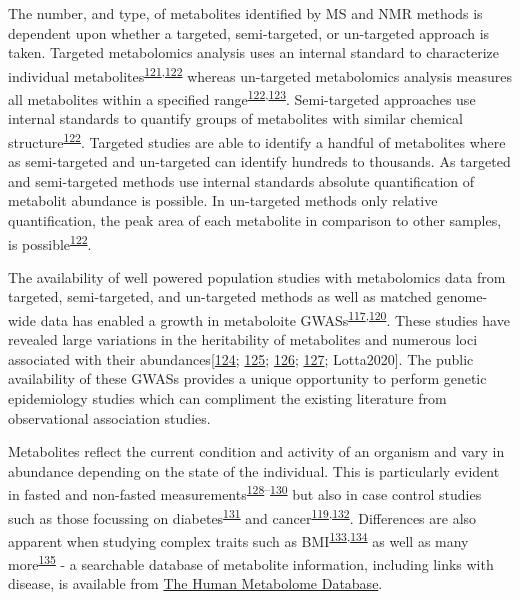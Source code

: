 \documentclass[11pt,twoside]{bristolthesis}
\begin{document}
The number, and type, of metabolites identified by MS and NMR methods is dependent upon whether a targeted, semi-targeted, or un-targeted approach is taken. Targeted metabolomics analysis uses an internal standard to characterize individual metabolites\textsuperscript{\protect\hyperlink{ref-Roberts2012}{121},\protect\hyperlink{ref-Liu2017b}{122}} whereas un-targeted metabolomics analysis measures all metabolites within a specified range\textsuperscript{\protect\hyperlink{ref-Liu2017b}{122},\protect\hyperlink{ref-Vinayavekhin2010}{123}}. Semi-targeted approaches use internal standards to quantify groups of metabolites with similar chemical structure\textsuperscript{\protect\hyperlink{ref-Liu2017b}{122}}. Targeted studies are able to identify a handful of metabolites where as semi-targeted and un-targeted can identify hundreds to thousands. As targeted and semi-targeted methods use internal standards absolute quantification of metabolit abundance is possible. In un-targeted methods only relative quantification, the peak area of each metabolite in comparison to other samples, is possible\textsuperscript{\protect\hyperlink{ref-Liu2017b}{122}}.

The availability of well powered population studies with metabolomics data from targeted, semi-targeted, and un-targeted methods as well as matched genome-wide data has enabled a growth in metaboloite GWASs\textsuperscript{\protect\hyperlink{ref-Chu2019}{117},\protect\hyperlink{ref-Fearnley2016}{120}}. These studies have revealed large variations in the heritability of metabolites and numerous loci associated with their abundances{[}\protect\hyperlink{ref-Shin2014}{124}; \protect\hyperlink{ref-Kettunen2016}{125}; \protect\hyperlink{ref-Long2017}{126}; \protect\hyperlink{ref-Gallois2019}{127}; Lotta2020{]}. The public availability of these GWASs provides a unique opportunity to perform genetic epidemiology studies which can compliment the existing literature from observational association studies.

Metabolites reflect the current condition and activity of an organism and vary in abundance depending on the state of the individual. This is particularly evident in fasted and non-fasted measurements\textsuperscript{\protect\hyperlink{ref-Carayol2015}{128}--\protect\hyperlink{ref-Teruya2019}{130}} but also in case control studies such as those focussing on diabetes\textsuperscript{\protect\hyperlink{ref-Guasch-Ferre2016}{131}} and cancer\textsuperscript{\protect\hyperlink{ref-Johnson2016}{119},\protect\hyperlink{ref-Liesenfeld2013}{132}}. Differences are also apparent when studying complex traits such as BMI\textsuperscript{\protect\hyperlink{ref-Moore2014}{133},\protect\hyperlink{ref-Cirulli2019}{134}} as well as many more\textsuperscript{\protect\hyperlink{ref-Wishart2018}{135}} - a searchable database of metabolite information, including links with disease, is available from \href{hmdb.ca}{The Human Metabolome Database}.
\end{document}
